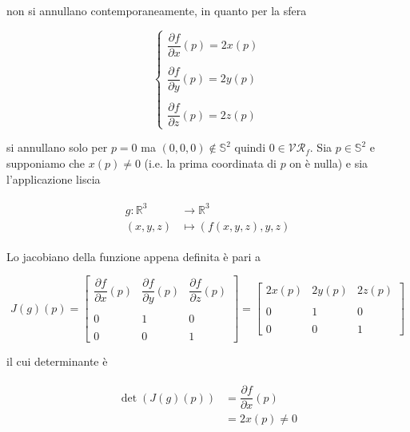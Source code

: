 non si annullano contemporaneamente, in quanto per la sfera

\begin{equation}
	\begin{cases}
		\dfrac{\partial f}{\partial x} (p) = 2x(p)\\\\
		\dfrac{\partial f}{\partial y} (p) = 2y(p)\\\\
		\dfrac{\partial f}{\partial z} (p) = 2z(p)
	\end{cases}
\end{equation}

si annullano solo per $ p=0 $ ma $ (0,0,0) \notin \mathbb{S}^{2} $ quindi $ 0 \in \mathcal{VR}_{f} $.
Sia $ p \in \mathbb{S}^{2} $ e supponiamo che $ x(p) \neq 0 $ (i.e. la prima coordinata di $ p $ on è nulla) e sia l'applicazione liscia

\begin{align}
	\begin{split}
		g : \mathbb{R}^{3} &\to \mathbb{R}^{3}\\
		(x,y,z) &\mapsto (f(x,y,z),y,z)
	\end{split}
\end{align}

Lo jacobiano della funzione appena definita è pari a

\begin{equation}
	J(g)(p) = \begin{bmatrix} \dfrac{\partial f}{\partial x} (p) & \dfrac{\partial f}{\partial y} (p) & \dfrac{\partial f}{\partial z} (p) \\\\ 0 & 1 & 0 \\\\ 0 & 0 & 1 \end{bmatrix} = \begin{bmatrix} 2x(p) & 2y(p) & 2z(p) \\\\ 0 & 1 & 0 \\\\ 0 & 0 & 1 \end{bmatrix}
\end{equation}

il cui determinante è

\begin{align}
	\begin{split}
		\det(J(g)(p)) &= \dfrac{\partial f}{\partial x} (p)\\
		&= 2x(p) \neq 0
	\end{split}
\end{align}

